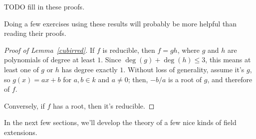 {\color{red}TODO} fill in these proofs.

Doing a few exercises using these results will probably be more helpful than reading their proofs.
\begin{proof}[Proof of Lemma~\ref{cubirred}]
If $f$ is reducible, then $f = gh$, where $g$ and $h$ are polynomials of degree at least $1$. Since $\deg(g) +
\deg(h)\le 3$, this means at least one of $g$ or $h$ has degree exactly $1$. Without loss of generality, assume
it's $g$, so $g(x) = ax + b$ for $a,b\in k$ and $a\ne 0$; then, $-b/a$ is a root of $g$, and therefore of $f$.

Conversely, if $f$ has a root, then it's reducible.
\end{proof}

In the next few sections, we'll develop the theory of a few nice kinds of field extensions.
